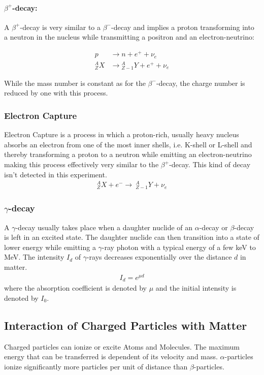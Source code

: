 \documentclass[12pt]{article}
\begin{document}
\paragraph*{$\beta^+$-decay:}
A $\beta^+$-decay is very similar to a $\beta^-$-decay and implies a proton transforming into a neutron in the nucleus while transmitting a positron and an electron-neutrino:

\begin{align*}
p &\rightarrow n + e^+ + \nu_e\\
{}_Z^A X &\rightarrow {}_{Z-1}^A Y + e^+ + \nu_e
\end{align*}

While the mass number is constant as for the $\beta^-$-decay, the charge number is reduced by one with this process.

\subsubsection{Electron  Capture}
Electron Capture is a process in which a proton-rich, usually heavy nucleus 
absorbs an electron from one of the most inner shells, i.e. K-shell or L-shell and thereby transforming a proton to a neutron while emitting an electron-neutrino making this process effectively very similar to the $\beta^+$-decay.
This kind of decay isn't detected in this experiment.
\begin{align}
{}_Z^A X + e^- \rightarrow\ {}_{Z-1}^A Y + \nu_e
\end{align}



\subsubsection{$\gamma$-decay}
A $\gamma$-decay usually takes place when a daughter nuclide of an $\alpha$-decay or $\beta$-decay is left in an excited state. The daughter nuclide can then transition into a state of lower energy while emitting a $\gamma$-ray photon with a typical energy of a few keV to MeV.
The intensity $I_d$ of $\gamma$-rays decreases exponentially over the distance $d$ in matter.
\begin{align}
I_d=e^{\mu d}
\end{align}
where the absorption coefficient is denoted by $\mu$ and the initial intensity is denoted by $I_0$.






\subsection{Interaction of Charged Particles with Matter}
Charged particles can ionize or excite Atoms and Molecules. The maximum energy that can be transferred is dependent of its velocity and mass.
$\alpha$-particles ionize significantly more particles per unit of distance than $\beta$-particles.
\end{document}
